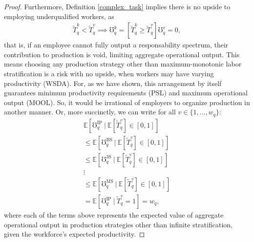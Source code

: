 \documentclass[hidelinks, nonatbib]{elsarticle}
\begin{document}
\begin{lemma}
\begin{proof}
        Furthermore, Definition \ref{complex_task} implies there is no upside to employing underqualified workers, as 
        \begin{gather}
            \tilde{T}_{q}^{k}
            <
            \tilde{T}_{q}^{v}
            \implies
            \mho_{q}^{k}
            =
            \left[
                \tilde{T}_{q}^{k}
                \geq
                \tilde{T}_{q}^{v}
            \right]
            \mho_{q}^{v}
            =
            0
            ,
        \end{gather}
        that is, if an employee cannot fully output a responsability spectrum, their contribution to production is void, limiting aggregate operational output. This means choosing any production strategy other than maximum-monotonic labor stratification is a risk with no upside, when workers may have varying productivity (WSDA). For, as we have shown, this arrangement by itself guarantees minimum productivity requirements (PSL) and maximum operational output (MOOL). So, it would be irrational of employers to organize production in another manner. Or, more succinctly, we can write for all $v \in \{1, \dots, w_q\}$:
        \begin{gather}
            \mathbb{E}[
                \mho_{q}^{\text{IP}}
                \
                |
                \
                \mathbb{E}[
                    \tilde{T}_{q}^{v}
                ]
                \in [0,1]
            ]
            \\
            \leq
            \mathbb{E}[
                \mho_{q}^{\text{BS}}
                \
                |
                \
                \mathbb{E}[
                    \tilde{T}_{q}^{v}
                ]
                \in [0,1]
            ]
            \\
            \leq
            \mathbb{E}[
                \mho_{q}^{\text{3S}}
                \
                |
                \
                \mathbb{E}[
                    \tilde{T}_{q}^{v}
                ]
                \in [0,1]
            ]
            \\
            \vdots
            \\
            \leq
            \mathbb{E}[
                \mho_{q}^{\text{MS}}
                \
                |
                \
                \mathbb{E}[
                    \tilde{T}_{q}^{v}
                ]
                \in [0,1]
            ]
            \\
            =
            \mathbb{E}[
                \mho_{q}^{\text{IP}}
                \
                |
                \
                \tilde{T}_{q}^{v}
                = 1
            ]
            =
            w_q
            ,
        \end{gather}
        where each of the terms above represents the expected value of aggregate operational output in production strategies other than infinite stratification, given the workforce's expected productivity.


\end{proof}
\end{lemma}
\end{document}
